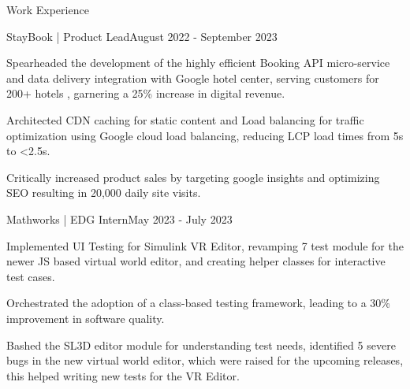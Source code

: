 \documentclass[10pt]{resume}
\begin{document}
    \begin{rSection}{Work Experience}

        \begin{rSubsection}{StayBook | Product Lead}{August 2022 - September 2023}
            \item Spearheaded the development of the highly efficient Booking API \vspace{-0.3em} micro-service and data delivery integration with Google hotel center, serving customers for 200+ hotels , garnering a 25\% increase in digital revenue.
            \item Architected CDN caching for static content and  Load  \vspace{-0.3em} balancing for traffic optimization using Google cloud load balancing, reducing LCP load times from 5s to <2.5s.
            \item Critically increased product sales by targeting google \vspace{-0.3em} insights and optimizing SEO resulting in 20,000 daily site visits. 
        \end{rSubsection}

        
        \begin{rSubsection}{Mathworks | EDG Intern}{May 2023 - July 2023}
            \item Implemented UI Testing for Simulink VR Editor, revamping 
            \vspace{-0.3em} 7 test module for the newer JS based virtual world editor, and creating helper classes for interactive test cases. 
            \item Orchestrated the adoption of a class-based testing framework, leading to a 30\% improvement in software quality. 
            \item Bashed the SL3D editor module for understanding test needs, \vspace{-0.3em} identified 5 severe bugs in the new virtual world editor, which were raised for the upcoming releases, this helped writing new tests for the VR Editor.

        \end{rSubsection}

    

\end{rSection}
\end{document}
